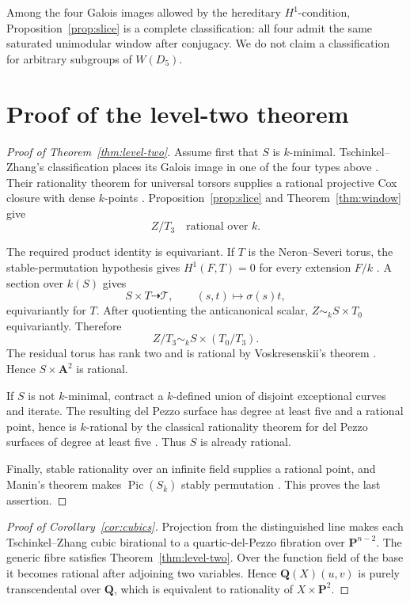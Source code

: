 \documentclass[11pt]{article}
\theoremstyle{remark}
\newcommand{\A}{\mathbf A}
\newcommand{\PP}{\mathbf P}
\newcommand{\Pic}{\operatorname{Pic}}
\begin{document}
Among the four Galois images allowed by the hereditary \(H^1\)-condition,
Proposition~\ref{prop:slice} is a complete classification: all four admit the
same saturated unimodular window after conjugacy.  We do not claim a
classification for arbitrary subgroups of \(W(D_5)\).

\section{Proof of the level-two theorem}

\begin{proof}[Proof of Theorem~\ref{thm:level-two}]
Assume first that \(S\) is \(k\)-minimal.  Tschinkel--Zhang's classification
places its Galois image in one of the four types above
\cite[Proposition~4.1 and Lemma~4.2]{TZ}.  Their rationality theorem for
universal torsors supplies a rational projective Cox closure with dense
\(k\)-points \cite[Theorem~3.4]{TZ}.  Proposition~\ref{prop:slice} and
Theorem~\ref{thm:window} give
\[
 Z/T_3\quad\text{rational over }k.
\]

The required product identity is equivariant.  If \(T\) is the
Neron--Severi torus, the stable-permutation hypothesis gives
\(H^1(F,T)=0\) for every extension \(F/k\)
\cite[Remark~2.2]{TZ}.  A section over \(k(S)\) gives
\[
 S\times T\dashrightarrow\mathcal T,\qquad (s,t)\longmapsto\sigma(s)t,
\]
equivariantly for \(T\).  After quotienting the anticanonical scalar,
\(Z\sim_k S\times T_0\) equivariantly.  Therefore
\[
 Z/T_3\sim_k S\times(T_0/T_3).
\]
The residual torus has rank two and is rational by Voskresenskii's theorem
\cite{Voskresenskii1967}.  Hence \(S\times\A^2\) is rational.

If \(S\) is not \(k\)-minimal, contract a \(k\)-defined union of disjoint
exceptional curves and iterate.  The resulting del Pezzo surface has degree
at least five and a rational point, hence is \(k\)-rational by the classical
rationality theorem for del Pezzo surfaces of degree at least five
\cite{Manin1966}.  Thus \(S\) is already rational.

Finally, stable rationality over an infinite field supplies a rational point,
and Manin's theorem makes \(\Pic(S_{\bar k})\) stably permutation
\cite{Manin1966}.  This proves the last assertion.
%
%
\end{proof}

\begin{proof}[Proof of Corollary~\ref{cor:cubics}]
Projection from the distinguished line makes each Tschinkel--Zhang cubic
birational to a quartic-del-Pezzo fibration over \(\PP^{n-2}\).  The generic
fibre satisfies Theorem~\ref{thm:level-two}.  Over the function field of the
base it becomes rational after adjoining two variables.  Hence
\(\mathbf Q(X)(u,v)\) is purely transcendental over \(\mathbf Q\), which is
equivalent to rationality of \(X\times\PP^2\).
%
%
\end{proof}
\end{document}
